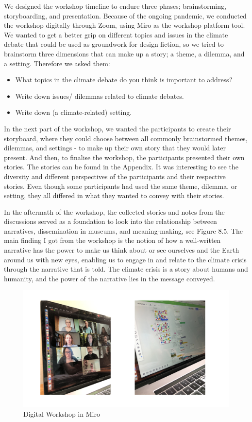We designed the workshop timeline to endure three phases; brainstorming, storyboarding, and presentation. Because of the ongoing pandemic, we conducted the workshop digitally through Zoom, using Miro as the workshop platform tool. We wanted to get a better grip on different topics and issues in the climate debate that could be used as groundwork for design fiction, so we tried to brainstorm three dimensions that can make up a story; a theme, a dilemma, and a setting. Therefore we asked them:

\begin{itemize}
    \item What topics in the climate debate do you think is important to address?
    \item Write down issues/ dilemmas related to climate debates.
    \item Write down (a climate-related) setting.
\end{itemize}

In the next part of the workshop, we wanted the participants to create their storyboard, where they could choose between all commonly brainstormed themes, dilemmas, and settings - to make up their own story that they would later present. And then, to finalise the workshop, the participants presented their own stories. The stories can be found in the Appendix. It was interesting to see the diversity and different perspectives of the participants and their respective stories. Even though some participants had used the same theme, dilemma, or setting, they all differed in what they wanted to convey with their stories. 

In the aftermath of the workshop, the collected stories and notes from the discussions served as a foundation to look into the relationship between narratives, dissemination in museums, and meaning-making, see Figure 8.5. The main finding I got from the workshop is the notion of how a well-written narrative has the power to make us think about or see ourselves and the Earth around us with new eyes, enabling us to engage in and relate to the climate crisis through the narrative that is told. The climate crisis is a story about humans and humanity, and the power of the narrative lies in the message conveyed.

\begin{figure}[H]
\includegraphics[width=13cm]{pictures/process/narrative_workshop.png}
\caption{Digital Workshop in Miro}
\centering 
\end{figure}

